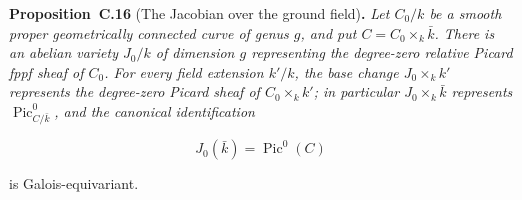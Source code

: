 \documentclass[11pt]{article}
\newenvironment{bpstatement}[2]{\par\addvspace{0.6\baselineskip}\noindent\textbf{#1}#2\textbf{.}\enspace\ignorespaces}
  {\par\addvspace{0.4\baselineskip}}
\newenvironment{bpstatementit}[2]{\begin{bpstatement}{#1}{#2}\itshape\ignorespaces}{\end{bpstatement}}
\begin{document}
\label{bp167}%
\begin{bpstatementit}{Proposition~C.16}{ (The Jacobian over the ground field)}
Let \(C_0/k\) be a smooth proper geometrically connected curve of genus \(g\), and put \(C=C_0\times_k\bar k\). There is an abelian variety \(J_0/k\) of dimension \(g\) representing the degree-zero relative Picard fppf sheaf of \(C_0\). For every field extension \(k'/k\), the base change \(J_0\times_kk'\) represents the degree-zero Picard sheaf of \(C_0\times_kk'\); in particular \(J_0\times_k\bar k\) represents \(\operatorname{Pic}^0_{C/\bar k}\), and the canonical identification

\[
J_0(\bar k)=\operatorname{Pic}^0(C)
\]

is Galois-equivariant.
\end{bpstatementit}
\end{document}
